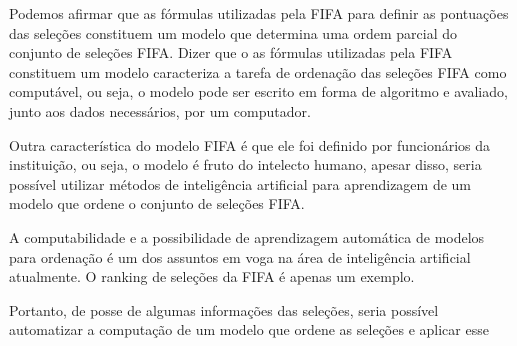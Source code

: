 Podemos afirmar que as fórmulas utilizadas pela FIFA para definir as pontuações das seleções constituem um modelo que determina uma ordem parcial do conjunto de seleções FIFA. Dizer que o as fórmulas utilizadas pela FIFA constituem um modelo caracteriza a tarefa de ordenação das seleções FIFA como computável, ou seja, o modelo pode ser escrito em forma de algoritmo e avaliado, junto aos dados necessários, por um computador.

Outra característica do modelo FIFA é que ele foi definido por funcionários da instituição, ou seja, o modelo é fruto do intelecto humano, apesar disso, seria possível utilizar métodos de inteligência artificial para aprendizagem de um modelo que ordene o conjunto de seleções FIFA.

A computabilidade e a possibilidade de aprendizagem automática de modelos para ordenação é um dos assuntos em voga na área de inteligência artificial atualmente. O ranking de seleções da FIFA é apenas um exemplo.

Portanto, de posse de algumas informações das seleções, seria possível automatizar a computação de um modelo que ordene as seleções e aplicar esse